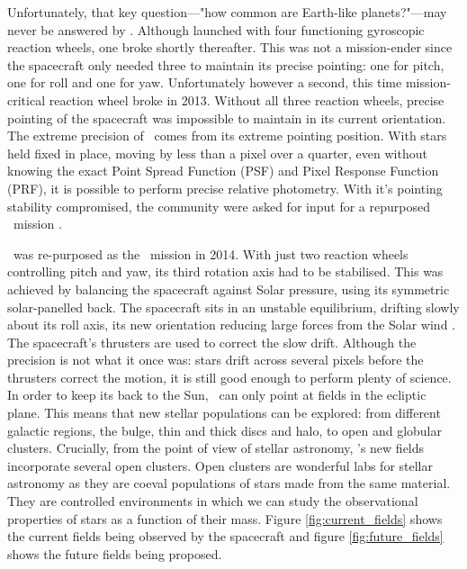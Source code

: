 Unfortunately, that key question---"how common are Earth-like planets?"---may
never be answered by \kepler \citep[or at least not very precisely, several
inferences have been performed by extrapolation, \eg][]{Foreman-Mackey2014,
Petigura2012, Burke2015}.
Although \kepler launched with four functioning gyroscopic reaction wheels,
one broke shortly thereafter.
This was not a mission-ender since the spacecraft only needed three to
maintain its precise pointing: one for pitch, one for roll and one for yaw.
Unfortunately however a second, this time mission-critical reaction wheel
broke in 2013.
Without all three reaction wheels, precise pointing of the spacecraft was
impossible to maintain in its current orientation.
The extreme precision of \kepler\ comes from its extreme pointing position.
With stars held fixed in place, moving by less than a pixel over a quarter,
even without knowing the exact Point Spread Function (PSF) and Pixel Response
Function (PRF), it is possible to perform precise relative photometry.
With it's pointing stability compromised, the community were asked for input
for a repurposed \kepler\ mission \citep[some examples here][]{Hogg2013,
Aigrain2013}.

\kepler\ was re-purposed as the \ktwo\ mission in 2014.
With just two reaction wheels controlling pitch and yaw, its third rotation
axis had to be stabilised.
This was achieved by balancing the spacecraft against Solar pressure, using
its symmetric solar-panelled back.
The spacecraft sits in an unstable equilibrium, drifting slowly about its roll
axis, its new orientation reducing large forces from the Solar wind
\citep{Howell2013}.
The spacecraft's thrusters are used to correct the slow drift.
Although the precision is not what it once was: stars drift across several
pixels before the thrusters correct the motion, it is still good enough to
perform plenty of science.
In order to keep its back to the Sun, \kepler\ can only point at fields in the
ecliptic plane.
This means that new stellar populations can be explored: from different
galactic regions, the bulge, thin and thick discs and halo, to open and
globular clusters.
Crucially, from the point of view of stellar astronomy, \kepler's new fields
incorporate several open clusters.
Open clusters are wonderful labs for stellar astronomy as they are coeval
populations of stars made from the same material.
They are controlled environments in which we can study the observational
properties of stars as a function of their mass.
Figure \ref{fig:current_fields} shows the current fields being observed by the
spacecraft and figure \ref{fig:future_fields} shows the future fields being
proposed.

